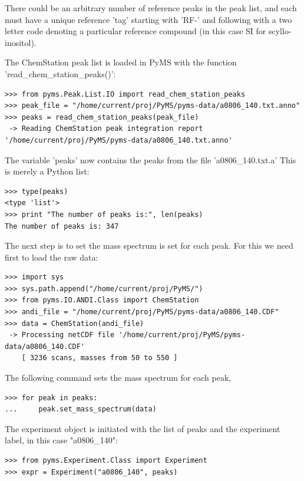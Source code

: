 \noindent
There could be an arbitrary number of reference peaks in the peak list, and each
must have a unique reference 'tag' starting with 'RF-' and following with a two
letter code denoting a particular reference compound (in this case SI for
scyllo-inositol).

The ChemStation peak list is loaded in PyMS with the function
'read\_chem\_station\_peaks()':

\begin{verbatim}
>>> from pyms.Peak.List.IO import read_chem_station_peaks
>>> peak_file = "/home/current/proj/PyMS/pyms-data/a0806_140.txt.anno"
>>> peaks = read_chem_station_peaks(peak_file)
 -> Reading ChemStation peak integration report
'/home/current/proj/PyMS/pyms-data/a0806_140.txt.anno'
\end{verbatim}

\noindent
The variable 'peaks' now contains the peaks from the file 'a0806\_140.txt.a'
This is merely a Python list:

\begin{verbatim}
>>> type(peaks)
<type 'list'>
>>> print "The number of peaks is:", len(peaks)
The number of peaks is: 347
\end{verbatim}

The next step is to set the mass spectrum is set for each peak. For this we need
first to load the raw data:

\begin{verbatim}
>>> import sys
>>> sys.path.append("/home/current/proj/PyMS/")
>>> from pyms.IO.ANDI.Class import ChemStation
>>> andi_file = "/home/current/proj/PyMS/pyms-data/a0806_140.CDF"
>>> data = ChemStation(andi_file)
 -> Processing netCDF file '/home/current/proj/PyMS/pyms-data/a0806_140.CDF'
    [ 3236 scans, masses from 50 to 550 ]
\end{verbatim}

\noindent
The following command sets the mass spectrum for each peak,

\begin{verbatim}
>>> for peak in peaks:
...     peak.set_mass_spectrum(data)
\end{verbatim}

The experiment object is initiated with the list of peaks and the experiment
label, in this case "a0806\_140":

\begin{verbatim}
>>> from pyms.Experiment.Class import Experiment
>>> expr = Experiment("a0806_140", peaks)
\end{verbatim}

